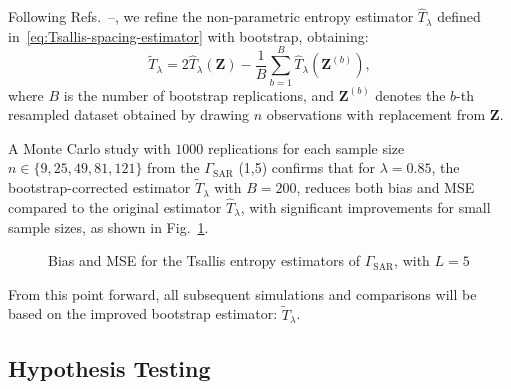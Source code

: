 \documentclass[
  lettersize  journal,
]{IEEEtran}%
\begin{document}
Following
Refs.~--,
we refine the non-parametric entropy estimator \(\widehat{T}_{\lambda}\)
defined in~\eqref{eq:Tsallis-spacing-estimator} with bootstrap,
obtaining: \begin{equation*}
\widetilde{T}_{\lambda} = 2\widehat{T}_{\lambda}(\bm{Z}) - \frac{1}{B} \sum_{b=1}^{B} \widehat{T}_{\lambda}(\bm{Z}^{(b)}),
\end{equation*} where \(B\) is the number of bootstrap replications, and
\(\bm{Z}^{(b)}\) denotes the \(b\)-th resampled dataset obtained by
drawing \(n\) observations with replacement from \(\bm{Z}\).

A Monte Carlo study with \(1000\) replications for each sample size
\(n \in \{9, 25, 49, 81, 121\}\) from the \(\Gamma_{\text{SAR}}\) (1,5)
confirms that for \(\lambda=0.85\), the bootstrap-corrected estimator
\(\widetilde{T}_{\lambda}\) with \(B=200\), reduces both bias and MSE
compared to the original estimator \(\widehat{T}_{\lambda}\), with
significant improvements for small sample sizes, as shown in
Fig.~\ref{fig-bias_mse_Tsallis}.

\begin{figure}[H]


\caption{\label{fig-bias_mse_Tsallis}Bias and MSE for the Tsallis
entropy estimators of \(\Gamma_{\text{SAR}}\), with \(L=5\)}

\end{figure}%

From this point forward, all subsequent simulations and comparisons will
be based on the improved bootstrap estimator:
\(\widetilde{T}_{\lambda}\).

\subsection{Hypothesis Testing}\label{hypothesis-testing}
\end{document}
